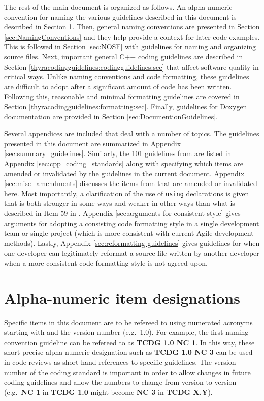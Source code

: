 The rest of the main document is organized as follows.  An
alpha-numeric convention for naming the various guidelines described
in this document is described in Section
{}\ref{sec:alpha_numeric_designations}.  Then, general naming
conventions are presented in Section {}\ref{sec:NamingConventions} and
they help provide a context for later code examples.  This is followed
in Section {}\ref{sec:NOSF} with guidelines for naming and organizing
source files.  Next, important general C++ coding guidelines are
described in Section
{}\ref{thyracodingguidelines:codingguidelines:sec} that affect
software quality in critical ways.  Unlike naming conventions and code
formatting, these guidelines are difficult to adopt after a
significant amount of code has been written.  Following this,
reasonable and minimal formatting guidelines are covered in Section
{}\ref{thyracodingguidelines:formatting:sec}.  Finally, guidelines for
Doxygen documentation are provided in Section
{}\ref{sec:DocumentionGuidelines}.

Several appendices are included that deal with a number of topics.  The
guidelines presented in this document are summarized in Appendix
{}\ref{sec:summary_guidelines}.  Similarly, the 101 guidelines from
{}\cite{C++CodingStandards05} are listed in Appendix
{}\ref{sec:cpp_coding_standards} along with specifying which items are
amended or invalidated by the guidelines in the current document.  Appendix
{}\ref{sec:misc_amendments} discusses the items from
{}\cite{C++CodingStandards05} that are amended or invalidated here.  Most
importantly, a clarification of the use of {}\texttt{using} declarations is
given that is both stronger in some ways and weaker in other ways than what is
described in Item 59 in {}\cite{C++CodingStandards05}.  Appendix
{}\ref{sec:arguments-for-consistent-style} gives arguments for adopting a
consisting code formatting style in a single development team or single
project (which is more consistent with current Agile development methods).
Lastly, Appendix {}\ref{sec:reformatting-guidelines} gives guidelines for when
one developer can legitimately reformat a source file written by another
developer when a more consistent code formatting style is not agreed upon.

%
\section{Alpha-numeric item designations}
\label{sec:alpha_numeric_designations}
%

Specific items in this document are to be refereed to using numerated
acronyms starting with {}\textbf{} and the version number
(e.g.\ 1.0).  For example, the first naming convention guideline can
be refereed to as {}\textbf{TCDG 1.0 NC 1}.  In this way, these short
precise alpha-numeric designation such as {}\textbf{TCDG 1.0 NC 3} can
be used in code reviews as short-hand references to specific
guidelines.  The version number of the coding standard is important in
order to allow changes in future coding guidelines and allow the
numbers to change from version to version (e.g.\ {}\textbf{NC 1} in
{}\textbf{TCDG 1.0} might become {}\textbf{NC 3} in {}\textbf{TCDG
X.Y}).

